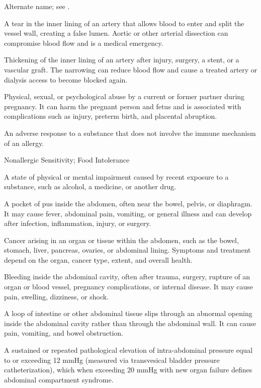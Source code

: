  Alternate name; see .

 A tear in the inner lining of an artery that allows blood to enter and split the vessel wall, creating a false lumen. Aortic or other arterial dissection can compromise blood flow and is a medical emergency.

 Thickening of the inner lining of an artery after injury, surgery, a stent, or a vascular graft. The narrowing can reduce blood flow and cause a treated artery or dialysis access to become blocked again.

 Physical, sexual, or psychological abuse by a current or former
partner during pregnancy. It can harm the pregnant person and fetus and is associated with complications such as injury,
preterm birth, and placental abruption.

 An adverse response to a substance that does not involve the immune mechanism of an allergy.

\synonyms
Nonallergic Sensitivity; Food Intolerance

 A state of physical or mental impairment caused by recent exposure to a substance, such as alcohol, a medicine, or another drug.

 A pocket of pus inside the abdomen, often near the bowel, pelvis, or diaphragm. It may cause fever, abdominal pain, vomiting, or general illness and can develop after infection, inflammation, injury, or surgery.

 Cancer arising in an organ or tissue within the abdomen, such as the bowel, stomach, liver, pancreas, ovaries, or abdominal lining. Symptoms and treatment depend on the organ, cancer type, extent, and overall health.

 Bleeding inside the abdominal cavity, often after trauma, surgery, rupture of an organ or blood vessel, pregnancy complications, or internal disease. It may cause pain, swelling, dizziness, or shock.

 A loop of intestine or other abdominal tissue slips through an abnormal opening inside the abdominal cavity rather than through the abdominal wall. It can cause pain, vomiting, and bowel obstruction.

 A sustained or repeated pathological elevation of intra-abdominal pressure equal to or exceeding 12 mmHg (measured via transvesical bladder pressure catheterization), which when exceeding 20 mmHg with new organ failure defines abdominal compartment syndrome.

